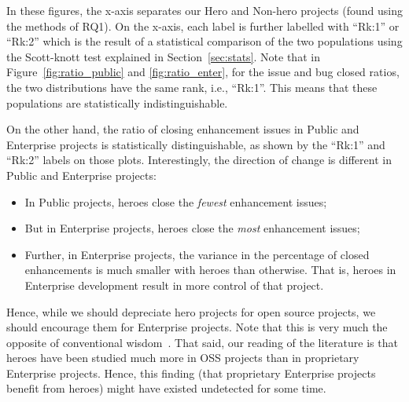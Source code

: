 \documentclass[sigconf]{acmart}
\newcommand{\bi}{\begin{itemize}[leftmargin=0.4cm]}
\newcommand{\ei}{\end{itemize}}
\theoremstyle{break}
\begin{document}
In these figures,
the x-axis separates our Hero and Non-hero projects (found using the methods
of RQ1).  On the x-axis, each label is further labelled with ``Rk:1'' or ``Rk:2'' which is the result
of a statistical comparison of the two populations using the Scott-knott test explained in Section~\ref{sec:stats}. Note that in Figure~\ref{fig:ratio_public} and \ref{fig:ratio_enter}, for the issue and bug closed ratios,
the two distributions have the same rank, i.e., ``Rk:1''. This means that these populations
are statistically indistinguishable.

On the other hand, the ratio of closing enhancement issues in Public and Enterprise projects
is statistically distinguishable, as shown by the ``Rk:1'' and ``Rk:2'' labels on those plots.
Interestingly, the direction of change is different in Public and Enterprise projects:
\bi
\item
In Public projects, heroes close the {\em fewest} enhancement issues;
\item
But in Enterprise projects, heroes close the {\em most} enhancement issues;
\item
Further, in Enterprise projects, the variance in the percentage of closed enhancements is much
smaller with heroes than otherwise. That is, heroes in Enterprise development result
in more control of that project.
\ei
Hence, while we should   depreciate hero projects for open source projects,
we should encourage them for Enterprise projects. Note that this is very much
the opposite of conventional wisdom~\cite{bier2011online}. That said,
our reading of the literature is that heroes have been studied much more in OSS
projects than in proprietary Enterprise projects. Hence, this finding (that proprietary Enterprise projects benefit from heroes) might have existed undetected for some time.
\end{document}
